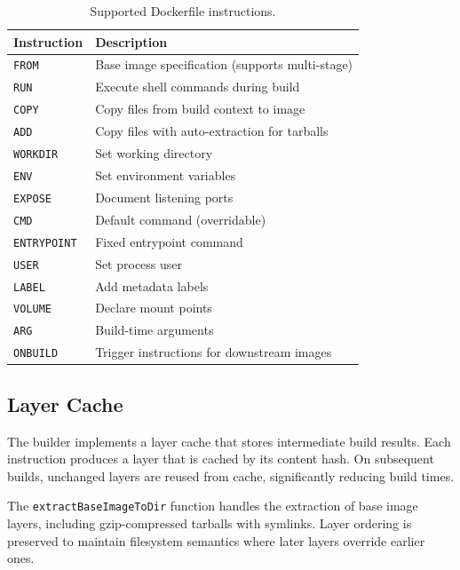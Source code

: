 \begin{table}[htbp]
  \centering
  \caption{Supported Dockerfile instructions.}
  \label{tab:dockerfile-instructions}
  \begin{tabularx}{\textwidth}{l X}
    \toprule
    \textbf{Instruction} & \textbf{Description} \\
    \midrule
    \texttt{FROM}         & Base image specification (supports multi-stage) \\
    \texttt{RUN}          & Execute shell commands during build \\
    \texttt{COPY}         & Copy files from build context to image \\
    \texttt{ADD}          & Copy files with auto-extraction for tarballs \\
    \texttt{WORKDIR}      & Set working directory \\
    \texttt{ENV}          & Set environment variables \\
    \texttt{EXPOSE}       & Document listening ports \\
    \texttt{CMD}          & Default command (overridable) \\
    \texttt{ENTRYPOINT}   & Fixed entrypoint command \\
    \texttt{USER}         & Set process user \\
    \texttt{LABEL}        & Add metadata labels \\
    \texttt{VOLUME}       & Declare mount points \\
    \texttt{ARG}          & Build-time arguments \\
    \texttt{ONBUILD}      & Trigger instructions for downstream images \\
    \bottomrule
  \end{tabularx}
\end{table}

\subsection{Layer Cache}
\label{sec:layer-cache}

The builder implements a layer cache that stores intermediate build
results. Each instruction produces a layer that is cached by its
content hash. On subsequent builds, unchanged layers are reused from
cache, significantly reducing build times.

The \texttt{extractBaseImageToDir} function handles the extraction of
base image layers, including gzip-compressed tarballs with symlinks.
Layer ordering is preserved to maintain filesystem semantics where
later layers override earlier ones.

